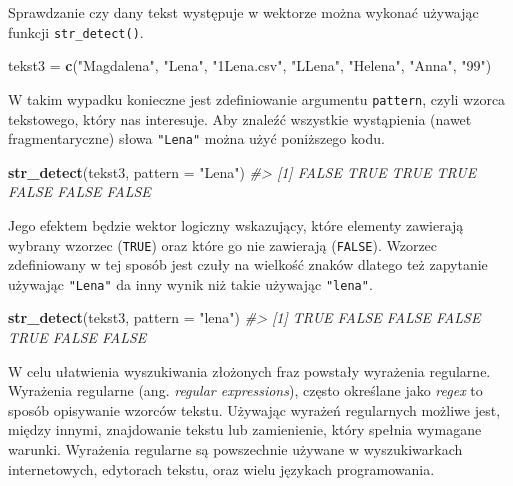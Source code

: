 \documentclass[paper=6in:9in,pagesize=pdftex,headinclude=on,footinclude=on,10pt]{scrbook}
\newenvironment{Shaded}{\begin{snugshade}}{\end{snugshade}}
\newcommand{\CommentTok}[1]{\textcolor[rgb]{0.56,0.35,0.01}{\textit{#1}}}
\newcommand{\DataTypeTok}[1]{\textcolor[rgb]{0.13,0.29,0.53}{#1}}
\newcommand{\KeywordTok}[1]{\textcolor[rgb]{0.13,0.29,0.53}{\textbf{#1}}}
\newcommand{\NormalTok}[1]{#1}
\newcommand{\StringTok}[1]{\textcolor[rgb]{0.31,0.60,0.02}{#1}}
\begin{document}
Sprawdzanie czy dany tekst występuje w wektorze można wykonać używając funkcji \texttt{str\_detect()}.

\begin{Shaded}
\begin{Highlighting}[]
\NormalTok{tekst3 =}\StringTok{ }\KeywordTok{c}\NormalTok{(}\StringTok{"Magdalena"}\NormalTok{, }\StringTok{"Lena"}\NormalTok{, }\StringTok{"1Lena.csv"}\NormalTok{, }\StringTok{"LLena"}\NormalTok{, }\StringTok{"Helena"}\NormalTok{, }\StringTok{"Anna"}\NormalTok{, }\StringTok{"99"}\NormalTok{)}
\end{Highlighting}
\end{Shaded}

W takim wypadku konieczne jest zdefiniowanie argumentu \texttt{pattern}, czyli wzorca tekstowego, który nas interesuje.
Aby znaleźć wszystkie wystąpienia (nawet fragmentaryczne) słowa \texttt{"Lena"} można użyć poniższego kodu.

\begin{Shaded}
\begin{Highlighting}[]
\KeywordTok{str_detect}\NormalTok{(tekst3, }\DataTypeTok{pattern =} \StringTok{"Lena"}\NormalTok{)}
\CommentTok{#> [1] FALSE  TRUE  TRUE  TRUE FALSE FALSE FALSE}
\end{Highlighting}
\end{Shaded}

Jego efektem będzie wektor logiczny wskazujący, które elementy zawierają wybrany wzorzec (\texttt{TRUE}) oraz które go nie zawierają (\texttt{FALSE}).
Wzorzec zdefiniowany w tej sposób jest czuły na wielkość znaków dlatego też zapytanie używając \texttt{"Lena"} da inny wynik niż takie używając \texttt{"lena"}.

\begin{Shaded}
\begin{Highlighting}[]
\KeywordTok{str_detect}\NormalTok{(tekst3, }\DataTypeTok{pattern =} \StringTok{"lena"}\NormalTok{)}
\CommentTok{#> [1]  TRUE FALSE FALSE FALSE  TRUE FALSE FALSE}
\end{Highlighting}
\end{Shaded}

W celu ułatwienia wyszukiwania złożonych fraz powstały wyrażenia regularne.
Wyrażenia regularne (ang. \emph{regular expressions}), często określane jako \emph{regex} to sposób opisywanie wzorców tekstu.
Używając wyrażeń regularnych możliwe jest, między innymi, znajdowanie tekstu lub zamienienie, który spełnia wymagane warunki.
Wyrażenia regularne są powszechnie używane w wyszukiwarkach internetowych, edytorach tekstu, oraz wielu językach programowania.
\end{document}

